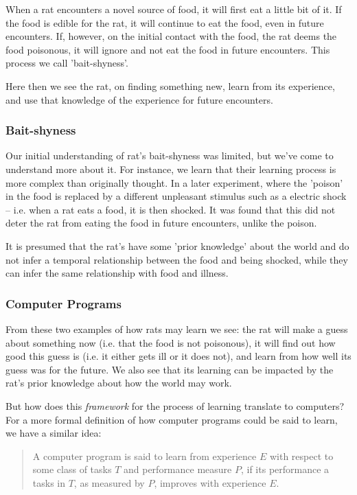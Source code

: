 \documentclass[10pt]{beamer}
\begin{document}
When a rat encounters a novel source of food, it will first eat a little bit of
it. If the food is edible for the rat, it will continue to eat the food, even in
future encounters. If, however, on the initial contact with the food, the rat deems
the food poisonous, it will ignore and not eat the food in future encounters. This
process we call 'bait-shyness'.

Here then we see the rat, on finding something new, learn from its experience, and
use that knowledge of the experience for future encounters.

\subsubsection*{Bait-shyness}
\label{sec:orgfe51f90}

Our initial understanding of rat's bait-shyness was limited, but we've come to
understand more about it. For instance, we learn that their learning process is more
complex than originally thought. In a later experiment, where the 'poison' in the
food is replaced by a different unpleasant stimulus such as a electric shock --
i.e. when a rat eats a food, it is then shocked. It was found that this did not
deter the rat from eating the food in future encounters, unlike the poison.

It is presumed that the rat's have some 'prior knowledge' about the world and do not
infer a temporal relationship between the food and being shocked, while they can
infer the same relationship with food and illness.

\subsubsection*{Computer Programs}
\label{sec:orgbc05435}

From these two examples of how rats may learn we see: the rat will make a guess about
something now (i.e. that the food is not poisonous), it will find out how good this
guess is (i.e. it either gets ill or it does not), and learn from how well its guess
was for the future. We also see that its learning can be impacted by the rat's prior
knowledge about how the world may work.

But how does this \emph{framework} for the process of learning translate to computers? For a
more formal definition of how computer programs could be said to learn, we have a
similar idea:

\begin{quote}
A computer program is said to learn from experience \(E\) with respect
to some class of tasks \(T\) and performance measure \(P\), if its performance
a tasks in \(T\), as measured by \(P\), improves with experience \(E\).
\end{quote}
\end{document}
